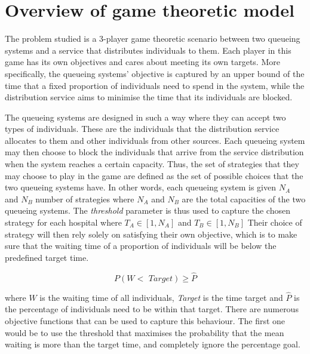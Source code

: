\section{Overview of game theoretic model}

The problem studied is a 3-player game theoretic scenario between two queueing 
systems and a service that distributes individuals to them. 
Each player in this game has its own objectives and cares about meeting its own 
targets.
More specifically, the queueing systems' objective is captured by an upper bound
of the time that a fixed proportion of individuals need to spend in the system, 
while the distribution service aims to minimise the time that its individuals 
are blocked.  

The queueing systems are designed in such a way where they can accept two types
of individuals. 
These are the individuals that the distribution service allocates to them and 
other individuals from other sources. 
Each queueing system may then choose to block the individuals that arrive from 
the service distribution when the system reaches a certain capacity. 
Thus, the set of strategies that they may choose to play in the game are defined 
as the set of possible choices that the two queueing systems have. 
In other words, each queueing system is given \( N_A \) and \( N_B \) number of 
strategies where \( N_A \) and \( N_B \) are the total capacities of the two 
queueing systems.
The \textit{threshold} parameter is thus used to capture the chosen 
strategy for each hospital where \( T_A \in \left[1, N_A \right] \) and 
\( T_B \in \left[1, N_B \right] \)
Their choice of strategy will then rely solely on satisfying their own 
objective, which is to make sure that the waiting time of a proportion of 
individuals will be below the predefined target time.

\begin{equation}
    P(W < \textit{ Target}) \geq \hat{P}
\end{equation}

where \(W\) is the waiting time of all individuals, \textit{Target} is the time 
target and \(\hat{P}\) is the percentage of individuals need to be within that 
target. 
There are numerous objective functions that can be used to capture this 
behaviour. 
The first one would be to use the threshold that maximises the probability that 
the mean waiting is more than the target time, and completely ignore the 
percentage goal.

